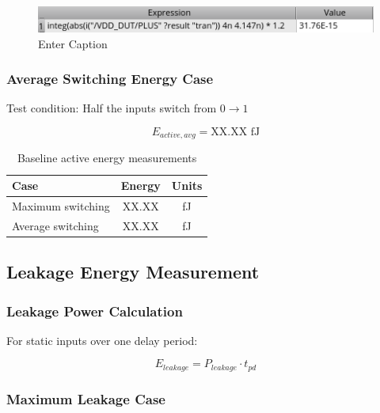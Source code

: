 \documentclass[12pt,letterpaper]{article}
\begin{document}
\begin{figure}[H]
    \centering
    \includegraphics[width=0.5\linewidth]{writeup//figures//baseline//active_energy/max_switching_energy_value.png}
    \caption{Enter Caption}
\end{figure}

\subsubsection{Average Switching Energy Case}

Test condition: Half the inputs switch from $0 \rightarrow 1$

\begin{equation}
E_{active,avg} = \text{XX.XX fJ}
\end{equation}

\begin{table}[H]
\centering
\caption{Baseline active energy measurements}
\label{tab:baseline_active_energy}
\begin{tabular}{@{}lcc@{}}
\toprule
\textbf{Case} & \textbf{Energy} & \textbf{Units} \\
\midrule
Maximum switching & XX.XX & fJ \\
Average switching & XX.XX & fJ \\
\bottomrule
\end{tabular}
\end{table}

\subsection{Leakage Energy Measurement}

\subsubsection{Leakage Power Calculation}

For static inputs over one delay period:

\begin{equation}
E_{leakage} = P_{leakage} \cdot t_{pd}
\end{equation}

\subsubsection{Maximum Leakage Case}
\end{document}
